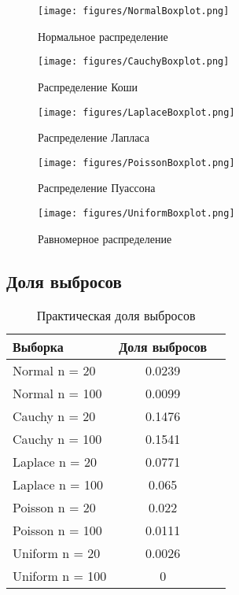 \documentclass[../main.tex]{subfiles}
\begin{document}
	\begin{figure}[H]
        \centering
        \texttt{[image: figures/NormalBoxplot.png]}
        \caption{Нормальное распределение}
        \label{fig:normal}
    \end{figure}
    
    \begin{figure}[H]
        \centering
        \texttt{[image: figures/CauchyBoxplot.png]}
        \caption{Распределение Коши}
        \label{fig:normal}
    \end{figure}
    
    \begin{figure}[H]
        \centering
        \texttt{[image: figures/LaplaceBoxplot.png]}
        \caption{Распределение Лапласа}
        \label{fig:normal}
    \end{figure}
    
     \begin{figure}[H]
        \centering
        \texttt{[image: figures/PoissonBoxplot.png]}
        \caption{Распределение Пуассона}
        \label{fig:normal}
    \end{figure}
    
    \begin{figure}[H]
        \centering
        \texttt{[image: figures/UniformBoxplot.png]}
        \caption{Равномерное распределение}
        \label{fig:normal}
    \end{figure}
    
    \subsection{Доля выбросов}
    \begin{table}[H]
	\centering
	\begin{tabular}{|l|c|c|}
		\hline
		Выборка & Доля выбросов	\\\hline
		\hline
		Normal n = 20 & 0.0239 \\\hline
		Normal n = 100 & 0.0099 \\\hline
		Cauchy n = 20 & 0.1476 \\\hline
		Cauchy n = 100 & 0.1541 \\\hline
		Laplace n = 20 & 0.0771 \\\hline
		Laplace n = 100 & 0.065 \\\hline
		Poisson n = 20 & 0.022 \\\hline
		Poisson n = 100 & 0.0111 \\\hline
		Uniform n = 20 & 0.0026 \\\hline
		Uniform n = 100 & 0 \\\hline
	\end{tabular}
	\caption{Практическая доля выбросов}
    \end{table}
    
\end{document}
